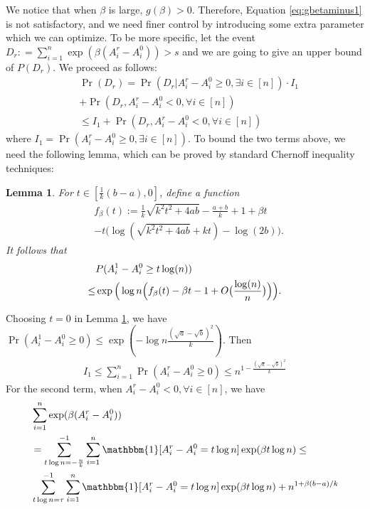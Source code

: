 \documentclass[conference]{IEEEtran}
\newtheorem{lemma}{Lemma}
\begin{document}
	We notice that when $\beta$ is large, $g(\beta) > 0$. Therefore, Equation \eqref{eq:gbetaminus1} is not satisfactory, and
	we need finer control by introducing some extra parameter which we can optimize. To be more specific, let
	the event $D_r : = \sum_{i=1}^n\exp ( \beta(A^r_i-A^0_i)) > s$
	and we are going to give an upper bound of $P(D_r)$. We proceed as follows: 
	\begin{align*}
	&\Pr(D_r) = 
	\Pr(D_r| A_i^r - A_i^0 \geq 0, \exists i\in [n])
	\cdot I_1 \\
	&+ \Pr(D_r, A_i^r - A_i^0  < 0, \forall i\in [n])
	\\
	& \leq I_1
	+ \Pr(D_r, A_i^r - A_i^0  < 0, \forall i\in [n])
	\end{align*}
	where $I_1 = \Pr( A_i^r - A_i^0 \geq 0, \exists i\in [n])$.
	To bound the two terms above, we need the following lemma, which can be proved by standard Chernoff inequality techniques:
	\begin{lemma}\label{lem:fb}
		For $t\in [\frac{1}{k}(b-a), 0]$,
		define a function
		\begin{align*}
		&f_{\beta}(t):=\frac{1}{k}\sqrt{k^2t^2+4ab} -\frac{a+b}{k} +1 +\beta t  \\
		&-t\big(\log(\sqrt{k^2t^2+4ab}+kt)-\log(2b) \big).
		\end{align*}
		It follows that
		\begin{align} \label{eq:upba}
		& P(A^1_i-A^0_i\ge t\log(n))  \notag\\
		\le &  \exp\Big(\log n \Big(f_{\beta}(t) -\beta t  - 1 + O\big(\frac{\log(n)}{n}\big) \Big)\Big) .
		\end{align}
	\end{lemma}
	Choosing $t=0$ in Lemma \ref{lem:fb}, we have
	$\Pr(A^1_i-A^0_i\ge 0 ) \leq \exp(-\log n \frac{(\sqrt{a}-\sqrt{b})^2}{k})$.
	Then
	\begin{align*}
	I_1 \leq \sum_{i=1}^n \Pr( A_i^r - A_i^0 \geq 0) \leq n^{1-\frac{(\sqrt{a}-\sqrt{b})^2}{k}}
	\end{align*}
	For the second term,
	when $A_i^r - A_i^0  < 0, \forall i\in [n]$, we have
	\begin{align*}
	&\sum_{i=1}^n\exp ( \beta(A^r_i-A^0_i)) \\
	& = \sum_{t\log n =-\frac{n}{k}}^{-1}\sum_{i=1}^n \mathbbm{1}[A^r_i - A^0_i = t \log n] \exp ( \beta  t\log n)\leq \\ 
	&
	\sum_{t\log n =\tau}^{-1}\sum_{i=1}^n \mathbbm{1}[A^r_i - A^0_i = t \log n]\exp ( \beta  t\log n) + n^{1+\beta(b-a)/k}
	\end{align*}
\end{document}
